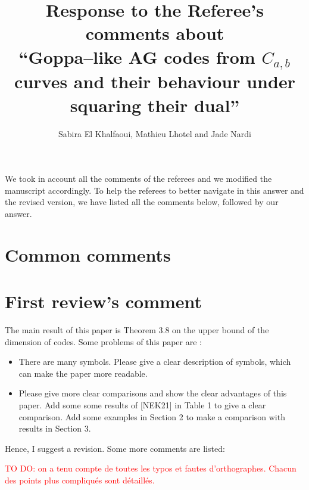 \documentclass[12pt,a4paper]{amsart}
\title[Goppa--like AG codes from $C_{a,b}$ curves and their behaviour under squaring their dual]{Response to the Referee's comments about  \\ ``Goppa--like AG codes from $C_{a,b}$ curves and their behaviour under squaring their dual''}
\author{Sabira El Khalfaoui, Mathieu Lhotel and Jade Nardi}
\newcommand\TODO[1]{\textcolor{red}{TO DO: #1}}
\begin{document}
\maketitle
We took in account all the comments of the referees and we modified the manuscript accordingly. To help the referees to better navigate in this answer and the revised version, we have listed all the comments below, followed by our answer. 
\section*{Common comments}
 
\section*{First review's comment}

The main result of this paper is Theorem 3.8 on the upper bound of the dimension of codes. Some problems
of this paper are :
\begin{itemize}
\item  There are many symbols. Please give a clear description of symbols, which can make the paper more
readable.
\item  Please give more clear comparisons and show the clear advantages of this paper. Add some some
results of [NEK21] in Table 1 to give a clear comparison. Add some examples in Section 2 to make
a comparison with results in Section 3.
\end{itemize}

Hence, I suggest a revision. Some more comments are listed:


\TODO{on a tenu compte de toutes les typos et fautes d'orthographes. Chacun des points plus compliqués sont détaillés.}
\end{document}
